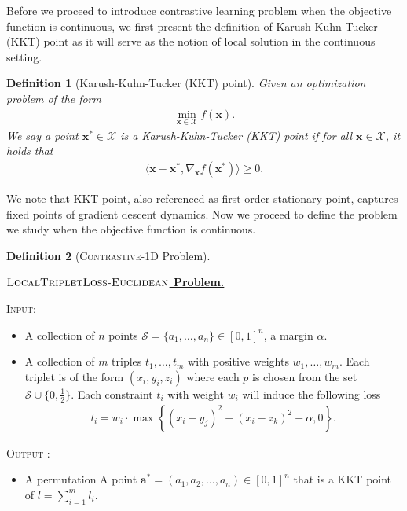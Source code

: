 \documentclass{article}
\theoremstyle{definition}  %
\theoremstyle{plain}
\newtheorem{definition}{Definition}
\numberwithin{observation}{section}
\numberwithin{claim}{section}
\numberwithin{fact}{section}
\numberwithin{lemma}{section}
\numberwithin{proposition}{section}
\numberwithin{theorem}{section}
\numberwithin{corollary}{section}
\numberwithin{definition}{section}
\def\vx{{\bm{x}}}
\newcommand{\calS}{\ensuremath{\mathcal{S}}}
\newcommand{\calX}{\ensuremath{\mathcal{X}}}
\newenvironment{nproblem}[1][\unskip]{%
  \medskip
  \begin{mdframed}
  \noindent
  \textbf{\underline{$#1$ Problem.}} \\
  \noindent
}{%
  \end{mdframed}
  \medskip %
}
\newcommand{\Contrastive}{\textsc{LocalTripletLoss-Euclidean}}
\theoremstyle{plain}
\begin{document}

Before we proceed to introduce contrastive learning problem when the objective function is continuous, we first present the definition of Karush-Kuhn-Tucker (KKT) point as it will serve as the notion of local solution in the continuous setting.

\begin{definition}[Karush-Kuhn-Tucker (KKT) point]
    Given an optimization problem of the form
    \begin{align*}
        \min_{\vx \in \calX} f(\vx).
    \end{align*}
    We say a point $\vx^* \in \calX$ is a Karush-Kuhn-Tucker (KKT) point if for all $\vx \in \calX$, it holds that
    \begin{align*}
        \langle\vx - \vx^*, \nabla_{\vx} f(\vx^*)\rangle \geq 0.
    \end{align*}
\end{definition}

We note that KKT point, also referenced as first-order stationary point, captures fixed points of gradient descent dynamics. Now we proceed to define the problem we study when the objective function is continuous.

\begin{definition}[\textsc{Contrastive-1D} Problem] \label{def:contrastive-1D}
\end{definition}

\begin{nproblem}[\Contrastive]
 \textsc{Input:}  
 \begin{itemize}
    \vspace{-0.1in}
   \item A collection of $n$ points $\calS = \{a_1,\dots,a_n\} \in [0, 1]^n$, a margin $\alpha$.
   \item A collection of $m$ triples $t_1,\dots, t_{m}$ with positive weights $w_1,\dots, w_{m}$. Each triplet is of the form $(x_i,y_i,z_i)$ where each $p$ is chosen from the set $\calS \cup \{0, \frac{1}{2}\}$. Each constraint $t_i$ with weight $w_i$ will induce the following loss
   \begin{align*}
       l_i = w_i \cdot \max \left\{(x_i - y_j)^2 - (x_i - z_k)^2 + \alpha, 0\right\}.
   \end{align*}
\end{itemize}
\vspace{-0.1in}
  \noindent \textsc{Output :} \begin{itemize}[label = ]
      \vspace{-0.1in}
      \item A permutation A point $\bm{a}^* = (a_1, a_2, \dots, a_n) \in [0, 1]^n$ that is a KKT point of $l = \sum_{i = 1}^m l_i.$
      \end{itemize}
\end{nproblem}
\end{document}
